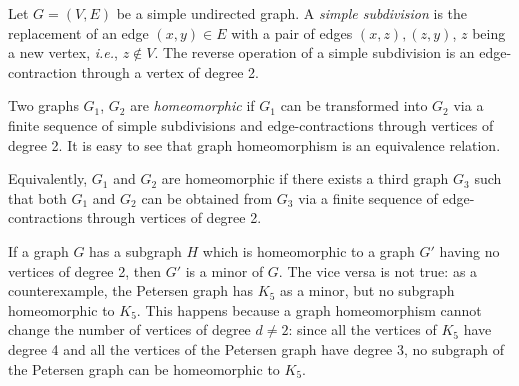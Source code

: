 \documentclass[12pt]{article}
\newcommand{\ie}{\textit{i.e.}}
\begin{document}
Let $G=(V,E)$ be a simple undirected graph.
A \emph{simple subdivision} is the replacement of an edge $(x,y)\in E$
with a pair of edges $(x,z),(z,y)$,
$z$ being a new vertex, \ie, $z\not\in V$.
The reverse operation of a simple subdivision
is an edge-contraction through a vertex of degree 2.

Two graphs $G_1$, $G_2$ are \emph{homeomorphic}
if $G_1$ can be transformed into $G_2$
via a finite sequence of simple subdivisions
and edge-contractions through vertices of degree 2.
It is easy to see that graph homeomorphism is an equivalence relation.

Equivalently, $G_1$ and $G_2$ are homeomorphic
if there exists a third graph $G_3$
such that both $G_1$ and $G_2$ can be obtained from $G_3$
via a finite sequence of edge-contractions through vertices of degree 2.

If a graph $G$ has a subgraph $H$
which is homeomorphic to a graph $G'$ having no vertices of degree 2,
then $G'$ is a minor of $G$.
The vice versa is not true:
as a counterexample, the Petersen graph
has $K_{5}$ as a minor, but no subgraph homeomorphic to $K_{5}$.
This happens because a graph homeomorphism
cannot change the number of vertices of degree $d\neq 2$:
since all the vertices of $K_{5}$ have degree 4
and all the vertices of the Petersen graph have degree 3,
no subgraph of the Petersen graph can be homeomorphic to $K_{5}$.

\end{document}
